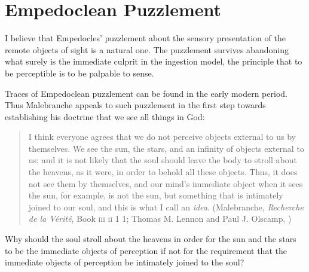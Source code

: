 
\section{Empedoclean Puzzlement} %
\label{sec:empedoclean_puzzlement}

I believe that Empedocles' puzzlement about the sensory presentation of the remote objects of sight is a natural one. The puzzlement survives abandoning what surely is the immediate culprit in the ingestion model, the principle that to be perceptible is to be palpable to sense.

Traces of Empedoclean puzzlement can be found in the early modern period. Thus Malebranche appeals to such puzzlement in the first step towards establishing his doctrine that we see all things in God:
\begin{quote}
	I think everyone agrees that we do not perceive objects external to us by themselves. We see the sun, the stars, and an infinity of objects external to us; and it is not likely that the soul should leave the body to stroll about the heavens, as it were, in order to behold all these objects. Thus, it does not see them by themselves, and our mind's immediate object when it sees the sun, for example, is not the sun, but something that is intimately joined to our soul, and this is what I call an \emph{idea}. (Malebranche, \emph{Recherche de la V\'{e}rit\'{e}}, Book \textsc{iii} \textsc{ii} 1 1; Thomas M. Lennon and Paul J. Olscamp, \citeyear[217]{Malebranche:1997sf})
\end{quote}
Why should the soul stroll about the heavens in order for the sun and the stars to be the immediate objects of perception if not for the requirement that the immediate objects of perception be intimately joined to the soul?

